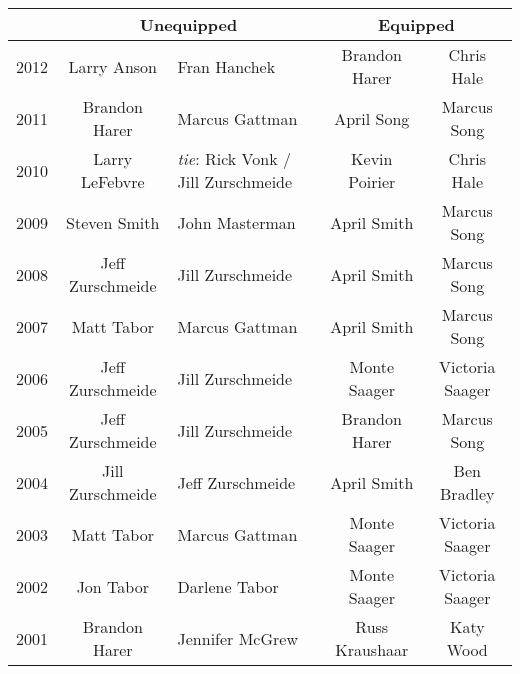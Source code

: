 \begin{tabular}{ |c|c|p{1.25in}|c|c| }
  \hline
  \multicolumn{1}{|c|}{} &
  \multicolumn{2}{|c|}{Unequipped} &
  \multicolumn{2}{|c|}{Equipped} \\
  \hline
  2012 & Larry Anson & Fran Hanchek & Brandon Harer & Chris Hale \\
  \hline
  2011 & Brandon Harer & Marcus Gattman & April Song & Marcus Song \\
  \hline
  2010 & Larry LeFebvre & \textit{tie}: Rick Vonk / \newline
         Jill Zurschmeide & Kevin Poirier & Chris Hale \\
  \hline
  2009 & Steven Smith & John Masterman & April Smith & Marcus Song \\
  \hline
  2008 & Jeff Zurschmeide & Jill Zurschmeide & April Smith & Marcus Song \\
  \hline
  2007 & Matt Tabor & Marcus Gattman & April Smith & Marcus Song \\
  \hline
  2006 & Jeff Zurschmeide & Jill Zurschmeide & Monte Saager & Victoria Saager \\
  \hline
  2005 & Jeff Zurschmeide & Jill Zurschmeide & Brandon Harer & Marcus Song \\
  \hline
  2004 & Jill Zurschmeide & Jeff Zurschmeide & April Smith & Ben Bradley \\
  \hline
  2003 & Matt Tabor & Marcus Gattman & Monte Saager & Victoria Saager \\
  \hline
  2002 & Jon Tabor & Darlene Tabor & Monte Saager & Victoria Saager \\
  \hline
  2001 & Brandon Harer & Jennifer McGrew & Russ Kraushaar & Katy Wood \\
  \hline
\end{tabular}